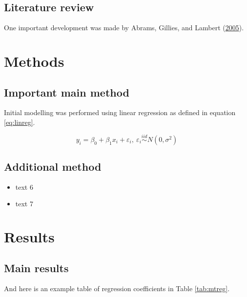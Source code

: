 \documentclass[
  openany]{book}
\providecommand{\tightlist}{%
  \setlength{\itemsep}{0pt}\setlength{\parskip}{0pt}}
\begin{document}
\hypertarget{literature-review}{%
\section{Literature review}\label{literature-review}}

One important development was made by Abrams, Gillies, and Lambert (\protect\hyperlink{ref-Abrams2005}{2005}).

\hypertarget{methods}{%
\chapter{Methods}\label{methods}}

\hypertarget{important-main-method}{%
\section{Important main method}\label{important-main-method}}

Initial modelling was performed using linear regression as defined in equation \eqref{eq:linreg}.

\begin{equation}
y_i = \beta_0 + \beta_1x_i + \varepsilon_i,\  \varepsilon_i \overset{iid}{\sim} N(0, \sigma^2)
\label{eq:linreg}
\end{equation}

\hypertarget{additional-method}{%
\section{Additional method}\label{additional-method}}

\begin{itemize}
\tightlist
\item
  text 6
\item
  text 7
\end{itemize}

\hypertarget{results}{%
\chapter{Results}\label{results}}

\hypertarget{main-results}{%
\section{Main results}\label{main-results}}

And here is an example table of regression coefficients in Table \ref{tab:mtreg}.
\end{document}

